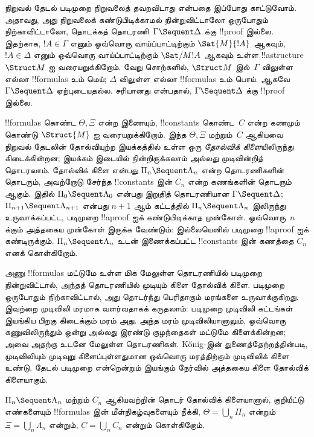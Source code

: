 \documentclass[../../../include/open-logic-section]{subfiles}
\begin{document}


நிறுவல் தேடல் படிமுறை நிறுவலைத் தவறவிடாது என்பதை இப்போது காட்டுவோம்.
அதாவது, அது நிறுவலைக் கண்டுபிடிக்காமல் நின்றுவிட்டாலோ ஒருபோதும்
நிற்காவிட்டாலோ, தொடக்கத் தொடரணி~$\Gamma \Sequent \Delta$ க்கு
!!{proof} இல்லை. இதற்காக, $!A \in \Gamma$ எனும் ஒவ்வொரு
வாய்ப்பாட்டிற்கும் $\Sat{M}{!A}$ ஆகவும், $!A \in \Delta$ எனும்
ஒவ்வொரு வாய்ப்பாட்டிற்கும் $\Sat/{M}{!A}$ ஆகவும் உள்ள
!!a{structure}~$\Struct M$ ஐ வரையறுக்கிறோம். வேறு சொற்களில்,
$\Struct M$ இல்~$\Gamma$ விலுள்ள எல்லா !!{formula}s உம் மெய்;
$\Delta$ விலுள்ள எல்லா !!{formula}s உம் பொய். ஆகவே
$\Gamma \Sequent \Delta$ ஏற்புடையதல்ல.  சரியானது
என்பதால், $\Gamma \Sequent \Delta$ க்கு !!{proof} இல்லை.

!!{formula}s கொண்ட $\Theta, \Xi$ என்ற இணையும், !!{constant}s
கொண்ட~$C$ என்ற கணமும் கொண்டு $\Struct{M}$ ஐ வரையறுக்கிறோம்.
இந்த $\Theta, \Xi$ மற்றும்~$C$ ஆகியவை நிறுவல் தேடலின்
தோல்வியுற்ற இயக்கத்தில் உள்ள ஒரு
\emph{தோல்விக் கிளை}யிலிருந்து கிடைக்கின்றன; இயக்கம் இடையில்
நின்றிருக்கலாம் அல்லது முடிவின்றித் தொடரலாம். தோல்விக் கிளை என்பது
$\Pi_n \Sequent \Lambda_n$ என்ற தொடரணிகளின் தொடரும், அவற்றோடு
சேர்ந்த !!{constant}s இன் $C_n$ என்ற கணங்களின் தொடரும் ஆகும்.
இதில் $\Pi_0 \Sequent \Lambda_0$ என்பது இறுதித் தொடரணியான
$\Gamma \Sequent \Delta$; $\Pi_{n+1} \Sequent \Lambda_{n+1}$
என்பது $n+1$ ஆம் கட்டத்தில் $\Pi_n \Sequent \Lambda_n$
இலிருந்து உருவாக்கப்பட்ட, படிமுறை !!a{proof} ஐக் கண்டுபிடிக்காத
முன்கோள். ஒவ்வொரு~$n$ க்கும் அத்தகைய முன்கோள் இருக்க வேண்டும்:
இல்லையெனில் படிமுறை !!a{proof} ஐக் கண்டிருக்கும்.
$\Pi_n \Sequent \Lambda_n$ உடன் இணைக்கப்பட்ட !!{constant}s இன்
கணத்தை $C_n$ எனக் கொள்கிறோம்.

அணு !!{formula}s மட்டுமே உள்ள மிக மேலுள்ள தொடரணியில் படிமுறை
நின்றுவிட்டால், அந்தத் தொடரணியில் முடியும் கிளை தோல்விக் கிளை.
படிமுறை ஒருபோதும் நிற்காவிட்டால், அது தொடர்ந்து பெரிதாகும்
மரங்களை உருவாக்குகிறது. இவற்றை முடிவிலி மரமாக வளர்வதாகக்
கருதலாம்: படிமுறை முடிவிலி கட்டங்கள் இயங்கிய பிறகு கிடைக்கும்
மரம் அது. அந்த மரம் முடிவிலியானாலும், ஒவ்வொரு கணுவிலிருந்தும்
ஒன்று அல்லது இரண்டு குழந்தைகள் மட்டுமே கிளைக்கின்றன; அவை
அதற்கு உடனே மேலுள்ள தொடரணிகள். K\H{o}nig-இன் துணைத்தேற்றத்தின்படி,
முடிவிலியும் முடிவுறு கிளைப்புள்ளதுமான ஒவ்வொரு மரத்திற்கும்
முடிவிலிக் கிளை உண்டு. தேடல் படிமுறை என்றென்றும் இயங்கும்
நேர்வில் அத்தகைய கிளை தோல்விக் கிளையாகும்.

$\Pi_n \Sequent \Lambda_n$ மற்றும் $C_n$ ஆகியவற்றின் தொடர்
தோல்விக் கிளையானால், குறியீட்டு எண்களையும் !!{formula}s இன்
மீள்நிகழ்வுகளையும் நீக்கி, $\Theta = \bigcup_n \Pi_n$ என்றும்
$\Xi = \bigcup_n \Lambda_n$ என்றும், $C = \bigcup_n C_n$
என்றும் கொள்கிறோம்.
\end{document}
